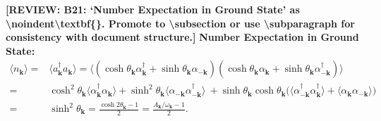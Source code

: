 \documentclass[aps, prx, nofootinbib, superscriptaddress]{revtex4-2}
\newcommand{\REVIEW}[1]{{\color{reviewcolor}\bfseries [REVIEW: #1]}}
\newcommand{\kvec}{\mathbf{k}}
\begin{document}
\REVIEW{B21: `Number Expectation in Ground State' as \textbackslash noindent\textbackslash textbf\{\}. Promote to \textbackslash subsection or use \textbackslash subparagraph for consistency with document structure.}
\noindent\textbf{Number Expectation in Ground State:}
\begin{align}
    \langle n_{\kvec} \rangle 
    = & \langle a_{\kvec}^{\dagger} a_{\kvec} \rangle 
    =  \langle 
    ( \cosh \theta_{\kvec} \alpha_{\kvec}^{\dagger} + \sinh \theta_{\kvec} \alpha_{-\kvec} ) 
    ( \cosh \theta_{\kvec} \alpha_{\kvec} + \sinh \theta_{\kvec} \alpha_{-\kvec}^{\dagger} ) 
    \rangle \\
    = & \cosh^{2} \theta_{\kvec} \langle  \alpha_{\kvec}^{\dagger} \alpha_{\kvec} \rangle 
    + \sinh^{2} \theta_{\kvec} \langle \alpha_{-\kvec} \alpha_{-\kvec}^{\dagger} \rangle \
    + \sinh \theta_{\kvec} \cosh \theta_{\kvec} 
    \big(\langle \alpha_{-\kvec}^{\dagger} \alpha_{\kvec}^{\dagger} \rangle + \langle \alpha_{\kvec} \alpha_{-\kvec} \rangle \big) \\
    = & \sinh^{2} \theta_{\kvec} 
    = \frac{\cosh 2 \theta_{\kvec} - 1}{2} 
    = \frac{A_{\kvec} / \omega_{\kvec} - 1}{2}.
\end{align}
\end{document}
